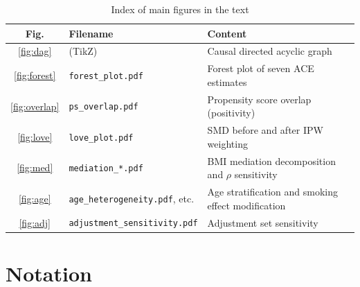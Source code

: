\documentclass[12pt,a4paper]{article}
\begin{document}
\begin{table}[H]
\centering
\caption{Index of main figures in the text}
\label{tab:figindex}
\begin{tabular}{clp{6.5cm}}
\toprule
Fig. & Filename & Content \\
\midrule
\ref{fig:dag}     & (TikZ)                    & Causal directed acyclic graph \\
\ref{fig:forest}  & \texttt{forest\_plot.pdf} & Forest plot of seven ACE estimates \\
\ref{fig:overlap} & \texttt{ps\_overlap.pdf}  & Propensity score overlap (positivity) \\
\ref{fig:love}    & \texttt{love\_plot.pdf}   & SMD before and after IPW weighting \\
\ref{fig:med}     & \texttt{mediation\_*.pdf} & BMI mediation decomposition and $\rho$ sensitivity \\
\ref{fig:age}     & \texttt{age\_heterogeneity.pdf}, etc. & Age stratification and smoking effect modification \\
\ref{fig:adj}     & \texttt{adjustment\_sensitivity.pdf} & Adjustment set sensitivity \\
\bottomrule
\end{tabular}
\end{table}

\section{Notation}
\label{app:notation}
\end{document}
